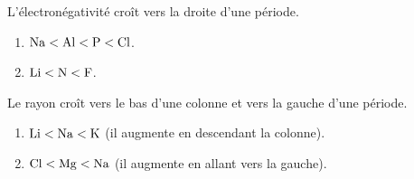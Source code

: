 \documentclass[11pt,a4paper]{article}
\begin{document}
\begin{corrige}
L'électronégativité croît vers la droite d'une période.
\begin{enumerate}[label=\alph*)]
  \item $\ce{Na} < \ce{Al} < \ce{P} < \ce{Cl}$.
  \item $\ce{Li} < \ce{N} < \ce{F}$.
\end{enumerate}
\end{corrige}

\begin{corrige}
Le rayon croît vers le bas d'une colonne et vers la gauche d'une période.
\begin{enumerate}[label=\alph*)]
  \item $\ce{Li} < \ce{Na} < \ce{K}$ (il augmente en descendant la colonne).
  \item $\ce{Cl} < \ce{Mg} < \ce{Na}$ (il augmente en allant vers la gauche).
\end{enumerate}
\end{corrige}
\end{document}
